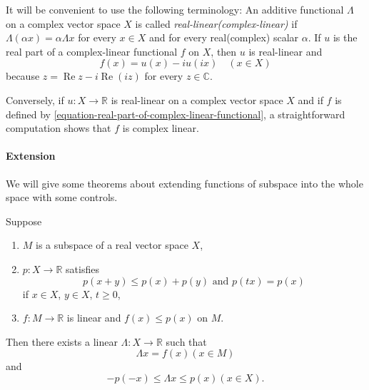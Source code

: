 \begin{remark}
  \label{remark-real-and-complex-linear}
  It will be convenient to use the following terminology: An additive functional \( \Lambda \) on a complex vector space \( X \) is called \emph{real-linear(complex-linear)} if \( \Lambda(\alpha x) = \alpha \Lambda x \) for every \( x \in X \) and for every real(complex) scalar \( \alpha \).
  If \( u \) is the real part of a complex-linear functional \( f \) on \( X \), then \( u \) is real-linear and
  \begin{equation}
    f(x) = u(x) - iu(ix)\quad (x \in X)
    \label{equation-real-part-of-complex-linear-functional}
  \end{equation}
  because \( z = \operatorname{Re} z - i \operatorname{Re}(iz) \) for every \( z \in \mathbb{C} \).

  Conversely, if \( u: X \to \mathbb{R} \) is real-linear on a complex vector space \( X \) and if \( f \) is defined by \eqref{equation-real-part-of-complex-linear-functional}, a straightforward computation shows that \( f \) is complex linear.
\end{remark}

\paragraph{Extension} We will give some theorems about extending functions of subspace into the whole space with some controls.

\begin{theorem}
  \label{theorem-real-linear-functional-extension}
  Suppose
  \begin{enumerate}
    \item \( M \) is a subspace of a real vector space \( X \),
    \item \( p: X \to \mathbb{R} \) satisfies
          \[
            p(x + y) \leq p(x) + p(y) \text{ and } p(tx) = p(x)
          \]
          if \( x \in X \), \( y \in X \), \( t \geq 0 \),
    \item \( f: M \to \mathbb{R} \) is linear and \( f(x) \leq p(x) \) on \( M \).
  \end{enumerate}
  Then there exists a linear \( \Lambda: X \to \mathbb{R} \) such that
  \[
    \Lambda x = f(x) (x \in M)
  \]
  and
  \[
    -p(-x) \leq \Lambda x \leq p(x) (x \in X).
  \]
\end{theorem}

